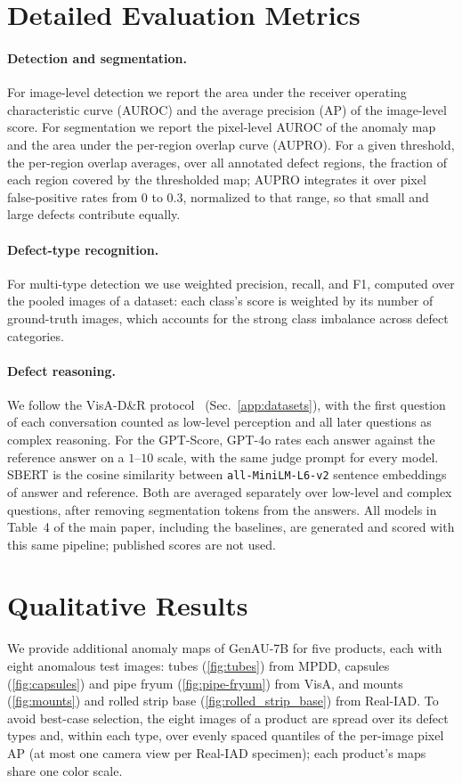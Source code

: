 \section{Detailed Evaluation Metrics}
\label{app:metrics}
\paragraph{Detection and segmentation.}
For image-level detection we report the area under the receiver operating characteristic curve (AUROC) and the average precision (AP) of the image-level score. For segmentation we report the pixel-level AUROC of the anomaly map and the area under the per-region overlap curve (AUPRO). For a given threshold, the per-region overlap averages, over all annotated defect regions, the fraction of each region covered by the thresholded map; AUPRO integrates it over pixel false-positive rates from $0$ to $0.3$, normalized to that range, so that small and large defects contribute equally.

\paragraph{Defect-type recognition.}
For multi-type detection we use weighted precision, recall, and F1, computed over the pooled images of a dataset: each class's score is weighted by its number of ground-truth images, which accounts for the strong class imbalance across defect categories.

\paragraph{Defect reasoning.}
We follow the VisA-D\&R protocol~\cite{xu2025towards} (Sec.~\ref{app:datasets}), with the first question of each conversation counted as low-level perception and all later questions as complex reasoning. For the GPT-Score, GPT-4o rates each answer against the reference answer on a $1$--$10$ scale, with the same judge prompt for every model. SBERT is the cosine similarity between \texttt{all-MiniLM-L6-v2} sentence embeddings of answer and reference. Both are averaged separately over low-level and complex questions, after removing segmentation tokens from the answers. All models in Table~4 of the main paper, including the baselines, are generated and scored with this same pipeline; published scores are not used.

\section{Qualitative Results}
\label{app:qualitative}
We provide additional anomaly maps of GenAU-7B for five products, each with eight anomalous test images: tubes (\cref{fig:tubes}) from MPDD, capsules (\cref{fig:capsules}) and pipe fryum (\cref{fig:pipe-fryum}) from VisA, and mounts (\cref{fig:mounts}) and rolled strip base (\cref{fig:rolled_strip_base}) from Real-IAD. To avoid best-case selection, the eight images of a product are spread over its defect types and, within each type, over evenly spaced quantiles of the per-image pixel AP (at most one camera view per Real-IAD specimen); each product's maps share one color scale.

